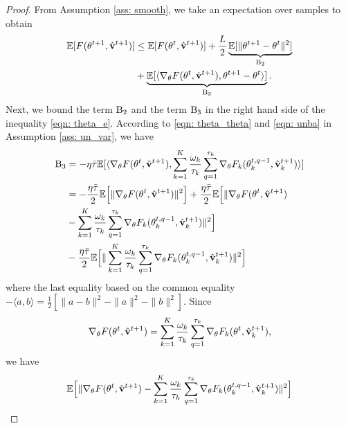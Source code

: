 \documentclass[twoside,journal]{IEEEtran}
\def\VectorFont{\bf}
\newcommand{\vv}{{\VectorFont v}}
\begin{document}
\begin{proof}
From Assumption \ref{ass: smooth}, we take an expectation over samples to obtain
\begin{align}\label{eqn: theta_e}
\nonumber \mathbb{E}[F(\theta^{t+1},\hat{\vv}^{t+1})]&\leq\mathbb{E}[F(\theta^{t},\hat{\vv}^{t+1})]
+\frac{L}{2}\underbrace{\mathbb{E}[\|\theta^{t+1}-\theta^{t}\|^2]}_{\textmd{B}_2}
\\
&+\underbrace{\mathbb{E}[\langle \nabla_{\theta}F(\theta^t,\hat{\vv}^{t+1}),\theta^{t+1}-\theta^{t}\rangle]}_{\textmd{B}_3}
.
\end{align}
Next, we bound the term $\textmd{B}_2$ and the term $\textmd{B}_3$ in the right hand side of the inequality \eqref{eqn: theta_e}. According to \eqref{eqn: theta_theta} and \eqref{eqn: unba} in Assumption \ref{ass: un_var}, we have
\begin{align}\label{eqn: xi_theta}
\nonumber \textmd{B}_3&=-\eta\bar{\tau}\mathbb{E}[\langle \nabla_{\theta}F(\theta^t,\hat{\vv}^{t+1}),
 \sum_{k=1}^K\frac{\omega_k}{\tau_k}\sum_{q=1}^{\tau_k}
\nabla_{\theta} F_k(\theta_k^{t,q-1}, \hat \vv_k^{t+1} )\rangle]\\
\nonumber &=-\frac{\eta\bar{\tau} }{2}\mathbb{E}\Big[\|\nabla_{\theta}F(\theta^t,\hat{\vv}^{t+1})\|^2\Big]
+\frac{\eta\bar{\tau}}{2}\mathbb{E}\Big[\|\nabla_{\theta}F(\theta^t,\hat{\vv}^{t+1})\\
\nonumber&
- \sum_{k=1}^K\frac{\omega_k}{\tau_k}\sum_{q=1}^{\tau_k}
\nabla_{\theta} F_k(\theta_k^{t,q-1}, \hat \vv_k^{t+1} )\|^2\Big]\\
&-\frac{\eta\bar{\tau}}{2}\mathbb{E}\Big[\|\sum_{k=1}^K\frac{\omega_k}{\tau_k}\sum_{q=1}^{\tau_k}
\nabla_{\theta} F_k(\theta_k^{t,q-1}, \hat \vv_k^{t+1} )\|^2\Big]
\end{align}
where  the last equality based on the common equality
$-\langle a, b\rangle=\frac{1}{2}[\|a-b\|^2-\|a\|^2-\|b\|^2]$. Since
\begin{align*}
\nabla_{\theta}F(\theta^t,\hat{\vv}^{t+1})=
\sum_{k=1}^K\frac{\omega_k}{\tau_k}\sum_{q=1}^{\tau_k}
\nabla_{\theta} F_k(\theta^t, \hat \vv_k^{t+1} ),
\end{align*}
 we have
\begin{align}\label{eqn: xi_theta2}
\nonumber&\mathbb{E}\Big[\|\nabla_{\theta}F(\theta^t,\hat{\vv}^{t+1})
-\sum_{k=1}^K\frac{\omega_k}{\tau_k}\sum_{q=1}^{\tau_k}
\nabla_{\theta} F_k(\theta_k^{t,q-1}, \hat \vv_k^{t+1} )\|^2\Big]\\

\end{align}
\end{proof}
\end{document}
